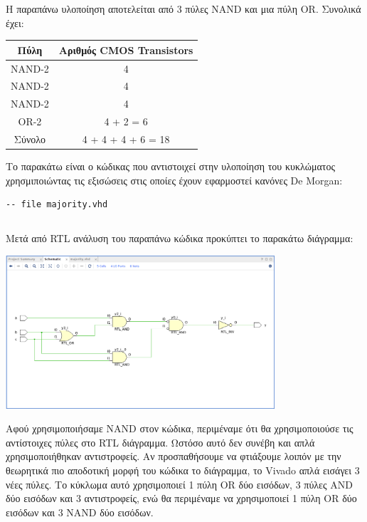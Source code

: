 \documentclass[]{article}
\begin{document}
Η παραπάνω υλοποίηση αποτελείται από 3 πύλες NAND και μια πύλη OR.
Συνολικά έχει:
\begin{center}
	\begin{tabular}{| c | c |}
		\hline Πύλη   & Αριθμός CMOS Transistors \\
		\hline NAND-2 & 4                        \\
		NAND-2        & 4                        \\
		NAND-2        & 4                        \\
		OR-2          & 4 + 2 = 6                \\
		\hline Σύνολο & 4 + 4 + 4 + 6 = 18       \\
		\hline
	\end{tabular}
\end{center}

Το παρακάτω είναι ο κώδικας που αντιστοιχεί στην υλοποίηση του κυκλώματος χρησμιποιώντας τις εξισώσεις στις οποίες έχουν εφαρμοστεί κανόνες De Morgan:
\begin{verbatim}
-- file majority.vhd
\end{verbatim}
\inputminted{vhdl}{./assign_1/majority.vhdl}

Μετά από RTL ανάλυση του παραπάνω κώδικα προκύπτει το παρακάτω διάγραμμα:
\begin{center}
	\includegraphics[width=10cm]{rtl_new.png}
\end{center}

Αφού χρησιμοποιήσαμε NAND στον κώδικα, περιμέναμε ότι θα χρησιμοποιούσε τις αντίστοιχες πύλες στο RTL διάγραμμα.
Ωστόσο αυτό δεν συνέβη και απλά χρησιμοποιήθηκαν αντιστροφείς. Αν προσπαθήσουμε να φτιάξουμε λοιπόν με την θεωρητικά
πιο αποδοτική μορφή του κώδικα το διάγραμμα, το Vivado απλά εισάγει 3 νέες πύλες. Το κύκλωμα αυτό χρησιμοποιεί 1 πύλη OR δύο εισόδων, 3 πύλες AND δύο εισόδων και 3 αντιστροφείς,
ενώ θα περιμέναμε να χρησιμοποιεί 1 πύλη OR δύο εισόδων και 3 NAND δύο εισόδων.
\end{document}
